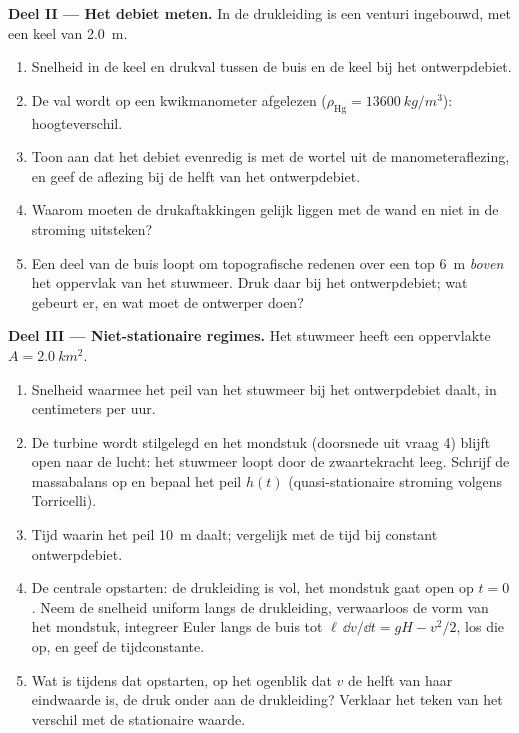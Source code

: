 \begin{problem}
\medskip
\noindent\textbf{Deel II --- Het debiet meten.}
In de drukleiding is een venturi ingebouwd, met een keel van \qty{2.0}{m}.
\begin{enumerate}[resume]
  \item Snelheid in de keel en drukval tussen de buis en de keel bij het
        ontwerpdebiet.
  \item De val wordt op een kwikmanometer afgelezen
        ($\rho_{\text{Hg}} =
        \qty{13600}{kg/m^3}$): hoogteverschil.
  \item Toon aan dat het debiet evenredig is met de wortel uit de
        manometeraflezing, en geef de aflezing bij de helft van het
        ontwerpdebiet.
  \item Waarom moeten de drukaftakkingen gelijk liggen met de wand en niet
        in de stroming uitsteken?
  \item Een deel van de buis loopt om topografische redenen over een top
        \qty{6}{m} \emph{boven} het oppervlak van het stuwmeer. Druk daar
        bij het ontwerpdebiet; wat gebeurt er, en wat moet de ontwerper
        doen?
\end{enumerate}

\medskip
\noindent\textbf{Deel III --- Niet-stationaire regimes.}
Het stuwmeer heeft een oppervlakte $A = \qty{2.0}{km^2}$.
\begin{enumerate}[resume]
  \item Snelheid waarmee het peil van het stuwmeer bij het ontwerpdebiet
        daalt, in centimeters per uur.
  \item De turbine wordt stilgelegd en het mondstuk (doorsnede uit vraag 4)
        blijft open naar de lucht: het stuwmeer loopt door de zwaartekracht
        leeg. Schrijf de massabalans op en bepaal het peil $h(t)$
        (quasi-stationaire stroming volgens Torricelli).
  \item Tijd waarin het peil \qty{10}{m} daalt; vergelijk met de tijd bij
        constant ontwerpdebiet.
  \item De centrale opstarten: de drukleiding is vol, het mondstuk gaat open
        op $t = 0$. Neem de snelheid uniform langs de drukleiding,
        verwaarloos de vorm van het mondstuk, integreer Euler langs de buis
        tot $\ell\,\dd v/\dd t = gH - v^2/2$, los die op, en geef de
        tijdconstante.
  \item Wat is tijdens dat opstarten, op het ogenblik dat $v$ de helft van
        haar eindwaarde is, de druk onder aan de drukleiding? Verklaar het
        teken van het verschil met de stationaire waarde.
\end{enumerate}


\end{problem}
